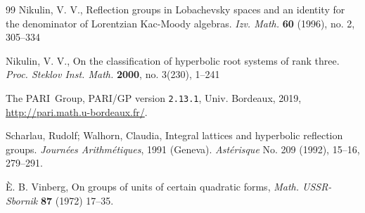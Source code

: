 \documentclass[12pt]{amsart}
\numberwithin{theorem}{section}
\numberwithin{equation}{section}
\numberwithin{figure}{section}
\theoremstyle{remark}
\begin{document}
\begin{thebibliography}{99}
Nikulin, V. V., 
        Reflection groups in Lobachevsky spaces and an identity 
        for the denominator of Lorentzian Kac-Moody algebras.  
        {\it Izv. Math.} {\bf60} (1996), no. 2, 305--334

Nikulin, V. V., 
On the classification of hyperbolic root systems of rank three.  {\it
Proc. Steklov Inst. Math.} {\bf2000}, no. 3(230), 1--241 

    The PARI~Group, PARI/GP version \texttt{2.13.1}, Univ. Bordeaux, 2019,
    \url{http://pari.math.u-bordeaux.fr/}.

Scharlau, Rudolf; Walhorn, Claudia,
Integral lattices and hyperbolic reflection groups.
{\it Journ\'ees Arithm\'etiques}, 1991 (Geneva).
{\it Ast\'erisque} No. 209 (1992), 15--16, 279--291. 

        \`E. B. Vinberg, On groups of units of certain quadratic forms,
		{\it Math. USSR-Sbornik} {\bf 87} (1972) 17--35.

\end{thebibliography}
\end{document}
